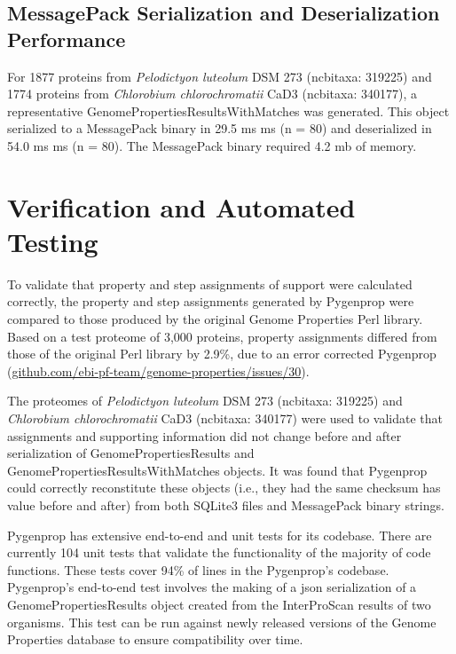 \subsection{MessagePack Serialization and Deserialization Performance} \label{messagepack-performance}

For 1877 proteins from \textit{Pelodictyon luteolum} DSM 273 (\gls{ncbitaxa}:  319225) and 1774 proteins from \textit{Chlorobium chlorochromatii} CaD3 (\gls{ncbitaxa}: 340177), a representative GenomePropertiesResultsWithMatches was generated. This object serialized to a MessagePack binary in 29.5 ms  ms (\gls{n} = 80) and deserialized in 54.0 ms  ms (\gls{n} = 80). The MessagePack binary required 4.2 \gls{mb} of memory.

\section{Verification and Automated Testing}

To validate that property and step assignments of support were calculated correctly, the property and step assignments generated by Pygenprop were compared to those produced by the original Genome Properties Perl library. Based on a test proteome of 3,000 proteins, property assignments differed from those of the original Perl library by 2.9\%, due to an error corrected Pygenprop (\href{http://github.com/ebi-pf-team/genome-properties/issues/30}{github.com/ebi-pf-team/genome-properties/issues/30}).

The proteomes of \textit{Pelodictyon luteolum} DSM 273 (\gls{ncbitaxa}:  319225) and \textit{Chlorobium chlorochromatii} CaD3 (\gls{ncbitaxa}: 340177) were used to validate that assignments and supporting information did not change before and after serialization of GenomePropertiesResults and GenomePropertiesResultsWithMatches objects. It was found that Pygenprop could correctly reconstitute these objects (i.e., they had the same checksum has value before and after) from both SQLite3 files and MessagePack binary strings.

Pygenprop has extensive end-to-end and unit tests for its codebase. There are currently 104 unit tests that validate the functionality of the majority of code functions. These tests cover 94\% of lines in the Pygenprop's codebase. Pygenprop's end-to-end test involves the making of a \gls{json} serialization of a GenomePropertiesResults object created from the InterProScan results of two organisms. This test can be run against newly released versions of the Genome Properties database to ensure compatibility over time. 

